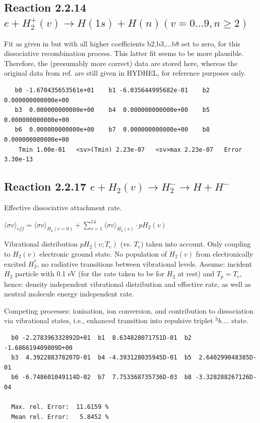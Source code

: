 \documentclass[12pt,dvipdfmx]{article}
\begin{document}
 \newpage
\subsection{
Reaction 2.2.14  $  e + H_2^+(v) \rightarrow H(1s) + H(n)   (v=0\ldots 9, n \geq 2)$}
Fit as given in \cite{kn:Janev}  but with all higher coefficients b2,b3,...b8 set to zero,
      for this dissociative recombination process.
      This latter fit seems to be more plausible. Therefore, the
      (presumably more correct)  data are stored here,
      whereas the original data from ref.\cite{kn:Janev} are still given in HYDHEL,
      for reference purposes only.



\begin{small}\begin{verbatim}
   b0 -1.670435653561e+01    b1 -6.035644995682e-01    b2  0.000000000000e+00
   b3  0.000000000000e+00    b4  0.000000000000e+00    b5  0.000000000000e+00
   b6  0.000000000000e+00    b7  0.000000000000e+00    b8  0.000000000000e+00
    Tmin 1.00e-01   <sv>(Tmin) 2.23e-07   <sv>max 2.23e-07   Error 3.30e-13
\end{verbatim}\end{small}


\newpage

\subsection{
Reaction 2.2.17  $e + H_2(v) \rightarrow H_2^- \rightarrow H + H^-$
}
Effective dissociative attachment rate.

$ \langle\sigma v \rangle_{eff} = \langle\sigma v \rangle_{H_2(v=0)} + \sum_{v=1}^{14}
\langle\sigma v \rangle_{H_2(v)} \cdot pH_2(v) $

Vibrational distribution $pH_2(v;T_e)$ (vs. $T_e$) taken into
account. Only coupling
to $H_2(v)$ electronic ground state. No population of $H_2(v)$ from electronically
excited $H_2^*$, no radiative transitions between vibrational levels.
Assume: incident $H_2$ particle with 0.1 eV
(for the rate taken to be for $H_2$ at rest) and $T_p = T_e$,
hence: density independent vibrational distribution and effective
rate, as well as neutral molecule energy independent rate.

Competing processes: ionisation, ion conversion, and contribution to
dissociation via vibrational states, i.e., enhanced transition into
repulsive triplet $^3b....$ state.

\begin{small}\begin{verbatim}
  b0 -2.278396332892D+01  b1  8.634828071751D-01  b2 -1.686619409809D+00
  b3  4.392288378207D-01  b4 -4.393128035945D-01  b5  2.640299048385D-01
  b6 -6.748601049114D-02  b7  7.753368735736D-03  b8 -3.328288267126D-04

  Max. rel. Error:  11.6159 %
  Mean rel. Error:   5.8452 %
\end{verbatim}\end{small}
\end{document}
